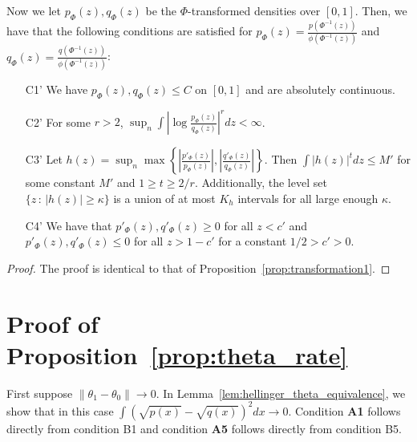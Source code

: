 \documentclass{article}
\begin{document}
\begin{proposition}
Now we let $p_\Phi(z), q_\Phi(z)$ be the $\Phi$-transformed densities over $[0,1]$.
Then, we have that the following conditions are satisfied for $p_\Phi(z) = \frac{p(\Phi^{-1}(z))}{\phi(\Phi^{-1}(z))}$ and $q_\Phi(z) = \frac{q(\Phi^{-1}(z))}{\phi(\Phi^{-1}(z))}$:
\begin{enumerate}
\item[C1'] We have $p_\Phi(z), q_\Phi(z) \leq C$ on $[0,1]$ and are absolutely continuous.
\item[C2'] For some $r > 2$, $\sup_n \int \left| \log \frac{p_\Phi(z)}{q_\Phi(z)} \right|^r dz < \infty$.
\item[C3'] Let $h(z) = \sup_n \max \left\{  \left|\frac{p'_\Phi(z)}{p_\Phi(z)} \right|, 
 \left|\frac{q'_\Phi(z)}{q_\Phi(z)}\right|  \right\} $. Then $\int |h(z)|^t dz \leq M'$ for some constant $M'$ and $1 \geq t \geq 2/r$. Additionally, the level set $\{z \,:\, |h(z)| \geq \kappa\}$ is a union of at most $K_h$ intervals for all large enough $\kappa$.  
\item[C4']  We have that $p'_\Phi(z), q'_\Phi(z) \geq 0$ for all $z < c'$ and $p'_\Phi(z), q'_\Phi(z) \leq 0$ for all $z > 1-c'$ for a constant $1/2 > c' > 0$. 
\end{enumerate}

\end{proposition}

\begin{proof}
The proof is identical to that of Proposition~\ref{prop:transformation1}.

\end{proof}

















\section{Proof of Proposition~\ref{prop:theta_rate}}
\label{sec:theta_rate_proof}


First suppose $\| \theta_1 - \theta_0 \| \rightarrow 0$. In Lemma~\ref{lem:hellinger_theta_equivalence}, we show that in this case $\int (\sqrt{p(x)} - \sqrt{q(x)})^2 dx \rightarrow 0$. Condition \textbf{A1} follows directly from condition B1 and condition \textbf{A5} follows directly from condition B5. 
\end{document}
